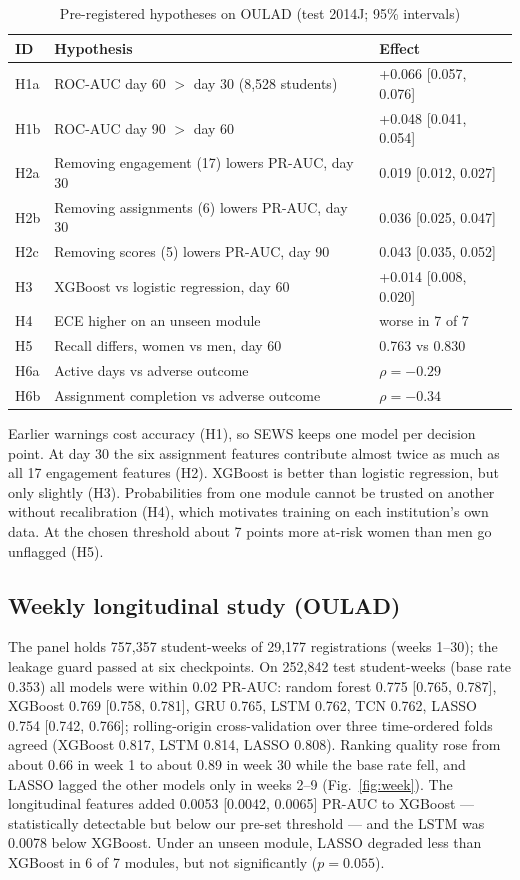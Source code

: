 \documentclass[conference]{IEEEtran}
\begin{document}
\begin{table}[t]
\caption{Pre-registered hypotheses on OULAD (test 2014J; 95\% intervals)}
\label{tab:hyp}
\centering
\footnotesize
\begin{tabular}{@{}lp{3.4cm}l@{}}
\toprule
ID & Hypothesis & Effect \\
\midrule
H1a & ROC-AUC day 60 $>$ day 30 (8,528 students) & +0.066 [0.057, 0.076] \\
H1b & ROC-AUC day 90 $>$ day 60 & +0.048 [0.041, 0.054] \\
H2a & Removing engagement (17) lowers PR-AUC, day 30 & 0.019 [0.012, 0.027] \\
H2b & Removing assignments (6) lowers PR-AUC, day 30 & 0.036 [0.025, 0.047] \\
H2c & Removing scores (5) lowers PR-AUC, day 90 & 0.043 [0.035, 0.052] \\
H3 & XGBoost vs logistic regression, day 60 & +0.014 [0.008, 0.020] \\
H4 & ECE higher on an unseen module & worse in 7 of 7 \\
H5 & Recall differs, women vs men, day 60 & 0.763 vs 0.830 \\
H6a & Active days vs adverse outcome & $\rho=-0.29$ \\
H6b & Assignment completion vs adverse outcome & $\rho=-0.34$ \\
\bottomrule
\end{tabular}
\end{table}

Earlier warnings cost accuracy (H1), so SEWS keeps one model per decision point. At day 30 the six assignment
features contribute almost twice as much as all 17 engagement features (H2). XGBoost is better than logistic
regression, but only slightly (H3). Probabilities from one module cannot be trusted on another without
recalibration (H4), which motivates training on each institution's own data. At the chosen threshold about 7 points
more at-risk women than men go unflagged (H5).

\subsection{Weekly longitudinal study (OULAD)}
The panel holds 757,357 student-weeks of 29,177 registrations (weeks 1--30); the leakage guard passed at six
checkpoints. On 252,842 test student-weeks (base rate 0.353) all models were within 0.02 PR-AUC: random forest
0.775 [0.765, 0.787], XGBoost 0.769 [0.758, 0.781], GRU 0.765, LSTM 0.762, TCN 0.762, LASSO 0.754 [0.742, 0.766];
rolling-origin cross-validation over three time-ordered folds agreed (XGBoost 0.817, LSTM 0.814, LASSO 0.808).
Ranking quality rose from about 0.66 in week 1 to about 0.89 in week 30 while the base rate fell, and LASSO lagged
the other models only in weeks 2--9 (Fig.~\ref{fig:week}). The longitudinal features added 0.0053 [0.0042,
0.0065] PR-AUC to XGBoost --- statistically detectable but below our pre-set threshold --- and the LSTM was 0.0078
below XGBoost. Under an unseen module, LASSO degraded less than XGBoost in 6 of 7 modules, but not significantly
($p=0.055$).
\end{document}
